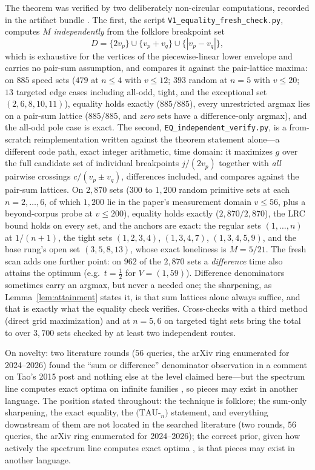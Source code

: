 The theorem was verified by two deliberately non-circular computations,
recorded in the artifact bundle \cite{prog-artifacts}. The first, the
script \texttt{V1\_equality\_fresh\_check.py}, computes $M$
\emph{independently} from the folklore breakpoint set
\[
D=\{2v_p\}\cup\{v_p+v_q\}\cup\{|v_p-v_q|\},
\]
which is exhaustive for the vertices of the piecewise-linear lower
envelope and carries no pair-sum assumption, and compares it against the
pair-lattice maxima: on $885$ speed sets ($479$ at $n\le 4$ with
$v\le 12$; $393$ random at $n=5$ with $v\le 20$; $13$ targeted edge
cases including all-odd, tight, and the exceptional set
$(2,6,8,10,11)$), equality holds exactly ($885/885$), every unrestricted
argmax lies on a pair-sum lattice ($885/885$, and \emph{zero} sets have
a difference-only argmax), and the all-odd pole case is exact. The
second, \texttt{EQ\_independent\_verify.py}, is a from-scratch
reimplementation written against the theorem statement alone---a
different code path, exact integer arithmetic, time domain: it maximizes
$g$ over the full candidate set of individual breakpoints $j/(2v_p)$
together with \emph{all} pairwise crossings $c/(v_p\pm v_q)$, differences
included, and compares against the pair-sum lattices. On $2{,}870$ sets
($300$ to $1{,}200$ random primitive sets at each $n=2,\dots,6$, of which
$1{,}200$ lie in the paper's measurement domain $v\le 56$, plus a
beyond-corpus probe at $v\le 200$), equality holds exactly
($2{,}870/2{,}870$), the LRC bound holds on every set, and the anchors
are exact: the regular sets $(1,\dots,n)$ at $1/(n{+}1)$, the tight sets
$(1,2,3,4)$, $(1,3,4,7)$, $(1,3,4,5,9)$, and the base rung's open set
$(3,5,8,13)$, whose exact loneliness is $M=5/21$. The fresh scan adds
one further point: on $962$ of the $2{,}870$ sets a \emph{difference}
time also attains the optimum (e.g.\ $t=\tfrac12$ for $V=(1,59)$).
Difference denominators sometimes carry an argmax, but never a needed
one; the sharpening, as Lemma~\ref{lem:attainment} states it, is that
sum lattices alone always suffice, and that is exactly what the
equality check verifies. Cross-checks with a third method (direct grid
maximization) and at $n=5,6$ on targeted tight sets bring the total to
over $3{,}700$ sets checked by at least two independent routes.

On novelty: two literature rounds ($56$ queries, the arXiv ring
enumerated for 2024--2026) found the ``sum or difference'' denominator
observation in a comment on Tao's 2015 post \cite{Tao-blog} and nothing
else at the level claimed here---but the spectrum line computes exact
optima on infinite families \cite{Cordella}, so pieces may exist in
another language. The position stated throughout: the
technique is folklore; the sum-only sharpening, the exact equality, the
$(\mathrm{TAU}$-$_n)$ statement, and everything downstream of them are
not located in the searched literature (two rounds, $56$ queries, the
arXiv ring enumerated for 2024--2026); the correct prior, given how
actively the spectrum line computes exact optima \cite{Cordella}, is
that pieces may exist in another language.
